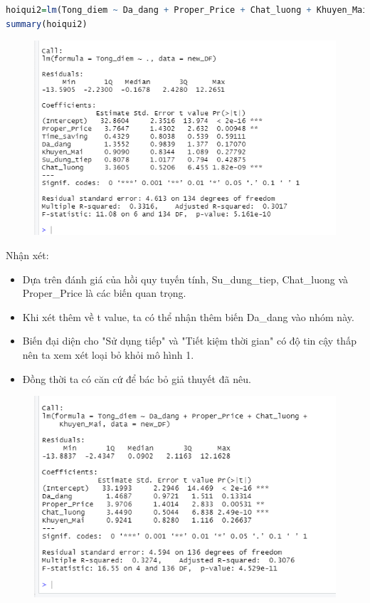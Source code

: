 \documentclass[a4paper]{article}
\theoremstyle{definition}
\begin{document}
\begin{itemize}
\begin{itemize}
\begin{lstlisting}[language=R, caption=Mô hình dữ liệu]
hoiqui2=lm(Tong_diem ~ Da_dang + Proper_Price + Chat_luong + Khuyen_Mai, data=new_DF )
summary(hoiqui2)
    \end{lstlisting}
     \begin{figure}[H]
            \centering
            \includegraphics[scale=1]{M0.png}
            \label{fig:my_label}
        \end{figure}
    Nhận xét:\\
    \begin{itemize}
        \item Dựa trên đánh giá của hồi quy tuyến tính, Su\_dung\_tiep, Chat\_luong và Proper\_Price là các biến quan trọng.\\
        \item Khi xét thêm về t value, ta có thể nhận thêm biến Da\_dang vào nhóm này.\\
       \item Biến đại diện cho "Sử dụng tiếp" và "Tiết kiệm thời gian" có độ tin cậy thấp nên ta xem xét loại bỏ khỏi mô hình 1.\\
       \item Đồng thời ta có căn cứ để bác bỏ giả thuyết đã nêu.\\
    \end{itemize} 
    \begin{figure}[H]
            \centering
            \includegraphics[scale=1]{M1.png}

\end{figure}
\end{itemize}
\end{itemize}
\end{document}
